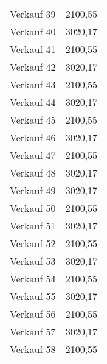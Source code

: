 \begin{center}
\begin{supertabular}{ | l | r |}
Verkauf 39 & 2100,55 \\
Verkauf 40 & 3020,17 \\
Verkauf 41 & 2100,55 \\
Verkauf 42 & 3020,17 \\
Verkauf 43 & 2100,55 \\
Verkauf 44 & 3020,17 \\
Verkauf 45 & 2100,55 \\
Verkauf 46 & 3020,17 \\
Verkauf 47 & 2100,55 \\
Verkauf 48 & 3020,17 \\
Verkauf 49 & 3020,17 \\
Verkauf 50 & 2100,55 \\
Verkauf 51 & 3020,17 \\
Verkauf 52 & 2100,55 \\
Verkauf 53 & 3020,17 \\
Verkauf 54 & 2100,55 \\
Verkauf 55 & 3020,17 \\
Verkauf 56 & 2100,55 \\
Verkauf 57 & 3020,17 \\
Verkauf 58 & 2100,55 \\
\end{supertabular}
\end{center}





